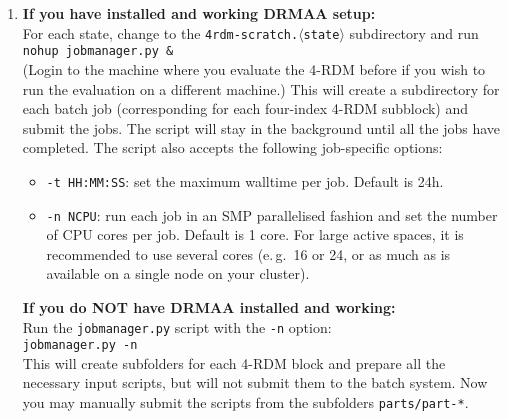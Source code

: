 \documentclass[bibliography=totoc,12pt,a4paper]{scrartcl}
\newcommand{\kwd}[1]{\texttt{#1}}
\begin{document}
\begin{enumerate}
 \item \textbf{If you have installed and working DRMAA setup:}\\
  For each state, change to the \kwd{4rdm-scratch.$\langle$state$\rangle$} subdirectory and run\\
 \kwd{nohup jobmanager.py \&}\\
 (Login to the machine where you evaluate the 4-RDM before if you wish to run the evaluation on a different machine.) This will create a subdirectory for each batch job (corresponding for each four-index 4-RDM subblock) and submit the jobs. The script will stay in the background until all the jobs have completed.
 The script also accepts the following job-specific options:
 \begin{itemize}
  \item \kwd{-t HH:MM:SS}: set the maximum walltime per job. Default is 24h.
  \item \kwd{-n NCPU}: run each job in an SMP parallelised fashion and set the number of CPU cores per job. Default is 1 core. For large active spaces, it is recommended to use several cores (e.\,g.\ 16 or 24, or as much as is available on a single node on your cluster).
 \end{itemize}
 \textbf{If you do NOT have DRMAA installed and working:}\\
 Run the \texttt{jobmanager.py} script with the \texttt{-n} option:\\
 \kwd{jobmanager.py -n}\\
 This will create subfolders for each 4-RDM block and prepare all the necessary input scripts, but will not submit them to the batch system. Now you may manually submit the scripts from the subfolders \kwd{parts/part-*}.


\end{enumerate}
\end{document}
